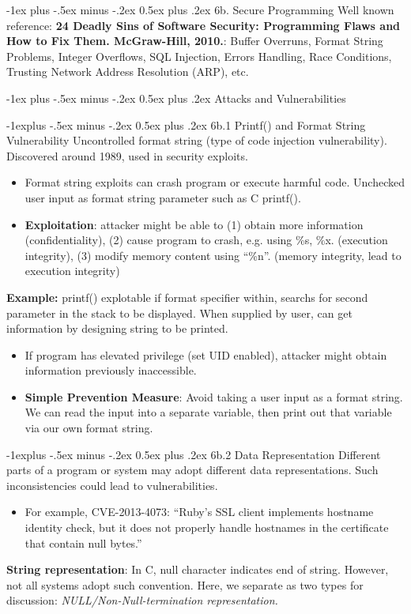 \documentclass[10pt, landscape]{article}
\makeatletter
\renewcommand{\section}{\@startsection{section}{1}{0mm}%
                                {-1ex plus -.5ex minus -.2ex}%
                                {0.5ex plus .2ex}%
                                {\normalfont\large\bfseries}}
\renewcommand{\subsection}{\@startsection{subsection}{2}{0mm}%
                                {-1explus -.5ex minus -.2ex}%
                                {0.5ex plus .2ex}%
                                {\normalfont\normalsize\bfseries}}
\makeatother
\begin{document}
\begin{multicols*}{3}
\section{6b. Secure Programming}
Well known reference: \textbf{24 Deadly Sins of Software Security: Programming Flaws and How to Fix Them. McGraw-Hill, 2010.}:  Buffer Overruns, Format String Problems, Integer Overflows, SQL Injection, Errors Handling, Race Conditions, Trusting Network Address Resolution (ARP), etc.

\section{Attacks and Vulnerabilities}

\subsection{6b.1 Printf() and Format String Vulnerability}
Uncontrolled format string (type of code injection vulnerability). Discovered around 1989, used in security exploits.
\begin{itemize}
\item Format string exploits can crash program or execute harmful code. Unchecked user input as format string parameter such as C printf().
\item \textbf{Exploitation}: attacker might be able to (1) obtain more information (confidentiality), (2) cause program to crash, e.g. using \%s, \%x. (execution integrity), (3) modify memory content using “\%n”. (memory integrity, lead to execution integrity)
\end{itemize}
\textbf{Example:} printf() explotable if format specifier within, searchs for second parameter in the stack to be displayed. When supplied by
user, can get information by designing string to be printed.
\begin{itemize}
\item If program has elevated privilege (set UID enabled), attacker might obtain information previously inaccessible.
\item \textbf{Simple Prevention Measure}: Avoid taking a user input as a format string. We can read the input into a separate variable, 
then print out that variable via our own format string. 
\end{itemize}

\subsection{6b.2 Data Representation}
Different parts of a program or system may adopt different data representations. Such inconsistencies could lead to vulnerabilities.
\begin{itemize}
\item For example, CVE-2013-4073: “Ruby’s SSL client implements hostname identity check, but 
it does not properly handle hostnames in the certificate that contain null bytes.”
\end{itemize}
\textbf{String representation}: In C, null character indicates end of string. However, not all systems adopt such convention. Here, we separate as two types for discussion: \textit{NULL/Non-Null-termination representation.}


\end{multicols*}
\end{document}

